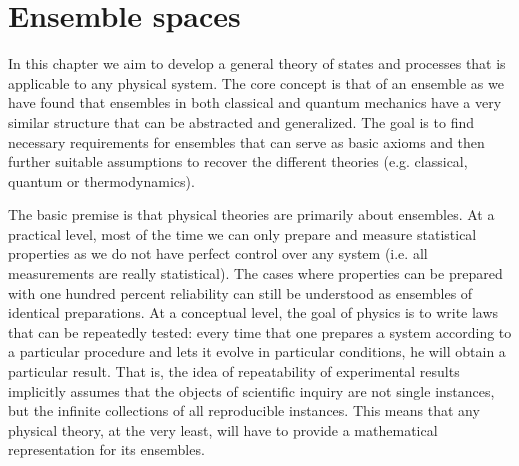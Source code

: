 
\def\>{\rangle}
\def\<{\langle}

\newcommand\mix{\mathrm{mix}}
\newcommand\component{\mathrm{comp}}
\newcommand\face{\mathrm{face}}
\newcommand\cospan{\mathrm{cospan}}
\newcommand\dist{\mathrm{dist}}
\newcommand\hull{\mathrm{hull}}
\newcommand\shull{\mathrm{shull}}
\newcommand\chull{\mathrm{chull}}
\newcommand\ahull{\mathrm{ahull}}
\newcommand\cahull{\mathrm{cahull}}
\newcommand\support{\mathrm{supp}}
\newcommand\scap{\mathrm{scap}}
\newcommand\fraction{\mathrm{frac}}
\newcommand\fcap{\mathrm{fcap}}

\newcommand\vspan{\mathrm{span}}
\newcommand\cl{\mathrm{cl}}

\def\separate{\downmodels}
\def\nseparate{\ndownmodels}
\def\ortho{\perp}
\def\northo{\nperp}

%

\newcommand{\ens}[1][e] {\mathsf{#1}} %
\newcommand{\Ens}[1][E] {\mathcal{#1}} %


\chapter{Ensemble spaces}

In this chapter we aim to develop a general theory of states and processes that is applicable to any physical system. The core concept is that of an ensemble as we have found that ensembles in both classical and quantum mechanics have a very similar structure that can be abstracted and generalized. The goal is to find necessary requirements for ensembles that can serve as basic axioms and then further suitable assumptions to recover the different theories (e.g. classical, quantum or thermodynamics).

The basic premise is that physical theories are primarily about ensembles. At a practical level, most of the time we can only prepare and measure statistical properties as we do not have perfect control over any system (i.e. all measurements are really statistical). The cases where properties can be prepared with one hundred percent reliability can still be understood as ensembles of identical preparations. At a conceptual level, the goal of physics is to write laws that can be repeatedly tested: every time that one prepares a system according to a particular procedure and lets it evolve in particular conditions, he will obtain a particular result. That is, the idea of repeatability of experimental results implicitly assumes that the objects of scientific inquiry are not single instances, but the infinite collections of all reproducible instances. This means that any physical theory, at the very least, will have to provide a mathematical representation for its ensembles.

